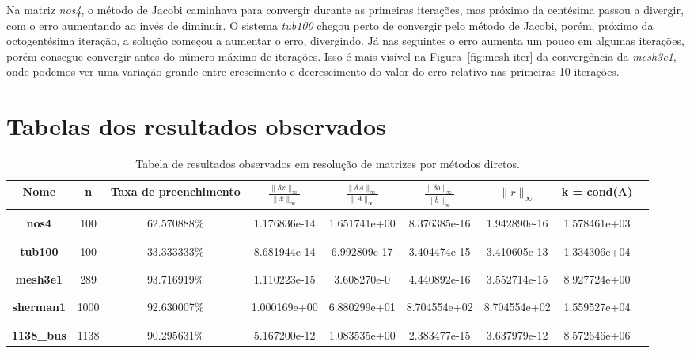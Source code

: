 \documentclass{article}
\begin{document}
Na matriz \textit{nos4}, o método de Jacobi caminhava para convergir durante as primeiras iterações, mas próximo da centésima passou a divergir, com o erro aumentando ao invés de diminuir. O sistema \textit{tub100} chegou perto de convergir pelo método de Jacobi, porém, próximo da octogentésima iteração, a solução começou a aumentar o erro, divergindo. Já nas seguintes o erro aumenta um pouco em algumas iterações, porém consegue convergir antes do número máximo de iterações. Isso é mais visível na Figura~\ref{fig:mesh-iter} da convergência da \textit{mesh3e1}, onde podemos ver uma variação grande entre crescimento e decrescimento do valor do erro relativo nas primeiras 10 iterações.

\storeareas\normalsetting
{}
\recalctypearea
\section{Tabelas dos resultados observados}
\label{sec:tabelas}
\begin{table}[H]
    \centering
    \begin{tabular}{|c|c|c|c|c|c|c|c|c|}
        \hline
         \rowcolor{Gray}
         \bfseries Nome & \bfseries n & \bfseries Taxa de preenchimento & $\frac{\|\delta x\|_\infty}{\|\bar{x}\|_\infty}$ & $\frac{\|\delta A\|_\infty}{\|A\|_\infty}$ &
         $\frac{\|\delta b\|_\infty}{\|\bar{b}\|_\infty}$ &
         $\|r\|_\infty$ &
         k = cond(A) \\
         \hline & & & & & & & \\ [-1em]
         \bfseries nos4 & 100 & 62.570888\% & 1.176836e-14 & 1.651741e+00 & 8.376385e-16 & 1.942890e-16 & 1.578461e+03 \\ & & & & & & & \\ [-1em]
         \hline \\ [-1em]
         \bfseries tub100 & 100 & 33.333333\% & 8.681944e-14 & 6.992809e-17 & 3.404474e-15 & 3.410605e-13 & 1.334306e+04 \\ & & & & & & & \\ [-1em]
         \hline \\ [-1em]
         \bfseries mesh3e1 & 289 & 93.716919\% & 1.110223e-15 & 3.608270e-0 & 4.440892e-16 & 3.552714e-15 & 8.927724e+00 \\ & & & & & & & \\ [-1em]
         \hline \\ [-1em]
         \bfseries sherman1 & 1000 & 92.630007\% & 1.000169e+00 & 6.880299e+01 & 8.704554e+02 & 8.704554e+02 & 1.559527e+04\\ & & & & & & & \\ [-1em]
         \hline \\ [-1em]
         \bfseries 1138\_bus & 1138 & 90.295631\% & 5.167200e-12 & 1.083535e+00 & 2.383477e-15 & 3.637979e-12 & 8.572646e+06
         \\ \hline
    \end{tabular}
    \caption{Tabela de resultados observados em resolução de matrizes por métodos diretos.}
    \label{tab:diretos}
\end{table}
\end{document}
